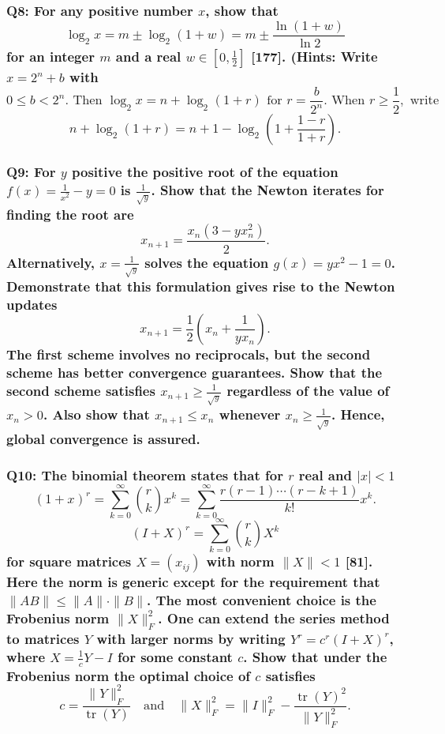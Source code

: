 \documentclass{article}
\begin{document}
\subsubsection*{Q8: For any positive number \(x\), show that
\[ \log_2 x = m \pm \log_2 (1 + w) = m \pm \frac{\ln(1 + w)}{\ln 2} \]
for an integer \(m\) and a real \(w \in \left[0, \frac{1}{2}\right]\) [177]. (Hints: Write \(x = 2^n + b\) with
\[ 0 \leq b < 2^n. \text{ Then } \log_2 x = n + \log_2 (1 + r) \text{ for } r = \frac{b}{2^n}. \text{ When } r \geq \frac{1}{2}, \text{ write } \]
\[ n + \log_2 (1 + r) = n + 1 - \log_2 \left(1 + \frac{1 - r}{1 + r}\right). \]}

\subsubsection*{Q9: For \(y\) positive the positive root of the equation \(f(x) = \frac{1}{x^2} - y = 0\) is \(\frac{1}{\sqrt{y}}\). Show that the Newton iterates for finding the root are
\[ x_{n+1} = \frac{x_n(3 - yx_n^2)}{2}. \]
Alternatively, \(x = \frac{1}{\sqrt{y}}\) solves the equation \(g(x) = yx^2 - 1 = 0\). Demonstrate that this formulation gives rise to the Newton updates
\[ x_{n+1} = \frac{1}{2} \left( x_n + \frac{1}{yx_n} \right). \]
The first scheme involves no reciprocals, but the second scheme has better convergence guarantees. Show that the second scheme satisfies \(x_{n+1} \geq \frac{1}{\sqrt{y}}\) regardless of the value of \(x_n > 0\). Also show that \(x_{n+1} \leq x_n\) whenever \(x_n \geq \frac{1}{\sqrt{y}}\). Hence, global convergence is assured.}

\subsubsection*{Q10: The binomial theorem states that for \(r\) real and \(|x| < 1\)
\[ (1 + x)^r = \sum_{k=0}^{\infty} \binom{r}{k} x^k = \sum_{k=0}^{\infty} \frac{r(r-1) \cdots (r-k+1)}{k!} x^k. \]
\[ (I + X)^r = \sum_{k=0}^{\infty} \binom{r}{k} X^k \]
for square matrices \(X = (x_{ij})\) with norm \(\|X\| < 1\) [81]. Here the norm is generic except for the requirement that \(\|AB\| \leq \|A\| \cdot \|B\|\). The most convenient choice is the Frobenius norm \(\|X\|_F^2\). One can extend the series method to matrices \(Y\) with larger norms by writing \(Y^r = c^r (I + X)^r\), where \(X = \frac{1}{c}Y - I\) for some constant \(c\). Show that under the Frobenius norm the optimal choice of \(c\) satisfies
\[ c = \frac{\|Y\|_F^2}{\operatorname{tr}(Y)} \quad \text{and} \quad \|X\|_F^2 = \|I\|_F^2 - \frac{\operatorname{tr}(Y)^2}{\|Y\|_F^2}. \]
}
\end{document}
